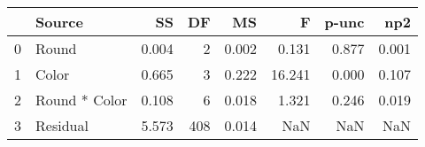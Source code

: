 \begin{tabular}{llrrrrrr}
\toprule
{} &         Source &     SS &   DF &     MS &       F &  p-unc &    np2 \\
\midrule
0 &          Round &  0.004 &    2 &  0.002 &   0.131 &  0.877 &  0.001 \\
1 &          Color &  0.665 &    3 &  0.222 &  16.241 &  0.000 &  0.107 \\
2 &  Round * Color &  0.108 &    6 &  0.018 &   1.321 &  0.246 &  0.019 \\
3 &       Residual &  5.573 &  408 &  0.014 &     NaN &    NaN &    NaN \\
\bottomrule
\end{tabular}
